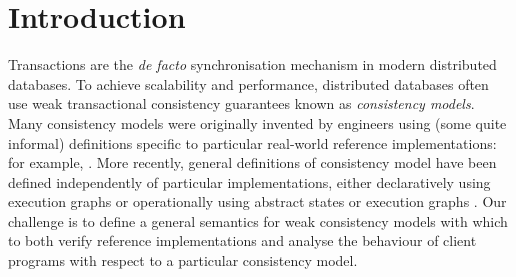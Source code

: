 \section{Introduction}
\label{sec:intro}

Transactions are the \emph{de facto} synchronisation mechanism in
modern distributed databases. To achieve scalability and performance,
distributed databases often use weak transactional consistency
guarantees known as \emph{consistency models}.  Many consistency
models were originally invented by engineers using (some quite
informal) definitions specific to particular real-world reference
implementations: for example,
\cite{ramp,si,distrsi,clocksi,cops,PSI-RA,NMSI,PSI}.
More recently, general definitions of consistency model have been
defined independently of particular implementations, either
declaratively using execution graphs \cite{adya,ev_transactions} or
operationally using abstract 
states or execution graphs
\cite{seebelieve,alonetogether,sureshConcur}. 
Our challenge  is to define a general semantics for weak consistency
models  with which to both 
verify  reference  implementations {and} analyse 
the behaviour of client programs with respect to a particular consistency
model. 






